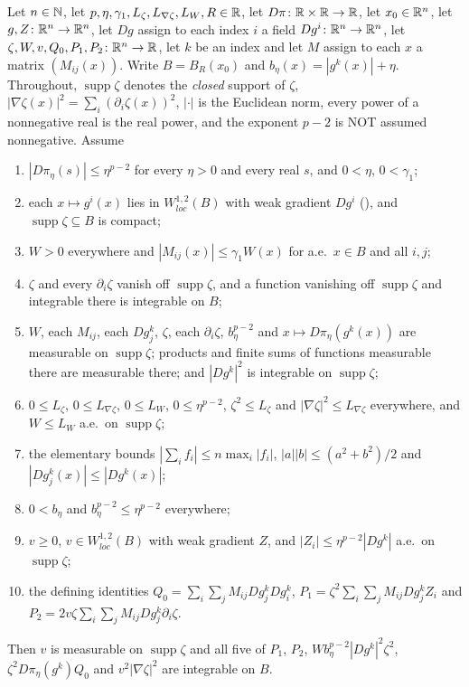 \begin{helper}
Let $n\in\mathbb{N}$, let $p,\eta,\gamma_1,L_\zeta,L_{\nabla\zeta},L_W,R\in\mathbb{R}$, let
$D\pi\colon\mathbb{R}\times\mathbb{R}\to\mathbb{R}$, let $x_0\in\mathbb{R}^n$, let $g,Z\colon\mathbb{R}^n\to\mathbb{R}^n$, let
$Dg$ assign to each index $i$ a field $Dg^i\colon\mathbb{R}^n\to\mathbb{R}^n$, let
$\zeta,W,v,Q_0,P_1,P_2\colon\mathbb{R}^n\to\mathbb{R}$, let $k$ be an index and let $M$ assign
to each $x$ a matrix $(M_{ij}(x))$.  Write $B=B_R(x_0)$ and
$b_\eta(x)=|g^k(x)|+\eta$.  Throughout, $\operatorname{supp}\zeta$ denotes the
\emph{closed} support of $\zeta$,
$|\nabla\zeta(x)|^2=\sum_i(\partial_i\zeta(x))^2$, $|\cdot|$ is the Euclidean
norm, every power of a nonnegative real is the real power, and the exponent
$p-2$ is NOT assumed nonnegative.  Assume
\begin{enumerate}
\item[(H1)] $|D\pi_\eta(s)|\le\eta^{p-2}$ for every $\eta>0$ and every real
  $s$, and $0<\eta$, $0<\gamma_1$;
\item[(H2)] each $x\mapsto g^i(x)$ lies in $W^{1,2}_{loc}(B)$ with weak
  gradient $Dg^i$ (), and
  $\operatorname{supp}\zeta\subseteq B$ is compact;
\item[(H3)] $W>0$ everywhere and $|M_{ij}(x)|\le\gamma_1W(x)$ for a.e.\
  $x\in B$ and all $i,j$;
\item[(H4)] $\zeta$ and every $\partial_i\zeta$ vanish off
  $\operatorname{supp}\zeta$, and a function vanishing off
  $\operatorname{supp}\zeta$ and integrable there is integrable on $B$;
\item[(H5)] $W$, each $M_{ij}$, each $Dg^k_j$, $\zeta$, each $\partial_i\zeta$,
  $b_\eta^{p-2}$ and $x\mapsto D\pi_\eta(g^k(x))$ are measurable on
  $\operatorname{supp}\zeta$; products and finite sums of functions measurable
  there are measurable there; and $|Dg^k|^2$ is integrable on
  $\operatorname{supp}\zeta$;
\item[(H6)] $0\le L_\zeta$, $0\le L_{\nabla\zeta}$, $0\le L_W$,
  $0\le\eta^{p-2}$, $\zeta^2\le L_\zeta$ and
  $|\nabla\zeta|^2\le L_{\nabla\zeta}$ everywhere, and $W\le L_W$ a.e.\ on
  $\operatorname{supp}\zeta$;
\item[(H7)] the elementary bounds $|\sum_if_i|\le n\max_i|f_i|$,
  $|a||b|\le(a^2+b^2)/2$ and $|Dg^k_j(x)|\le|Dg^k(x)|$;
\item[(H8)] $0<b_\eta$ and $b_\eta^{p-2}\le\eta^{p-2}$ everywhere;
\item[(H9)] $v\ge0$, $v\in W^{1,2}_{loc}(B)$ with weak gradient $Z$, and
  $|Z_i|\le\eta^{p-2}|Dg^k|$ a.e.\ on $\operatorname{supp}\zeta$;
\item[(H10)] the defining identities
  $Q_0=\sum_i\sum_jM_{ij}Dg^k_jDg^k_i$,
  $P_1=\zeta^2\sum_i\sum_jM_{ij}Dg^k_jZ_i$ and
  $P_2=2v\zeta\sum_i\sum_jM_{ij}Dg^k_j\partial_i\zeta$.
\end{enumerate}
Then $v$ is measurable on $\operatorname{supp}\zeta$ and all five of $P_1$,
$P_2$, $Wb_\eta^{p-2}|Dg^k|^2\zeta^2$, $\zeta^2D\pi_\eta(g^k)Q_0$ and
$v^2|\nabla\zeta|^2$ are integrable on $B$.
\end{helper}
